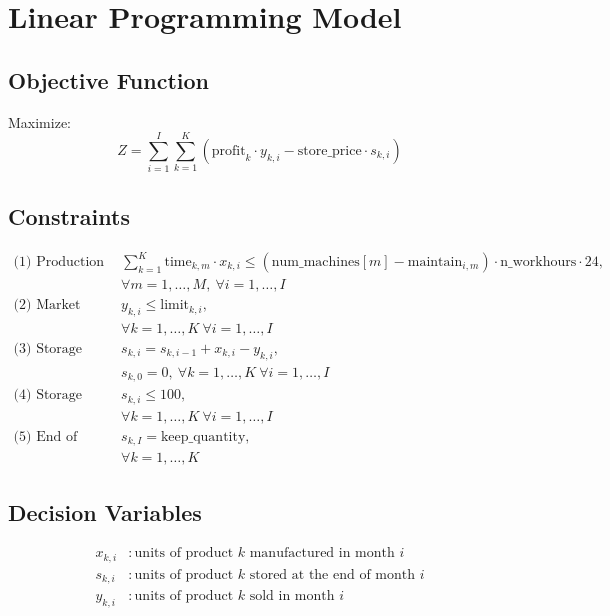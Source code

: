 \documentclass{article}
\begin{document}
\section*{Linear Programming Model}

\subsection*{Objective Function}

Maximize:
\[
Z = \sum_{i=1}^{I} \sum_{k=1}^{K} (\text{profit}_k \cdot y_{k,i} - \text{store\_price} \cdot s_{k,i})
\]

\subsection*{Constraints}

\begin{align*}
\text{(1) Production Time Constraints:} \quad & \sum_{k=1}^{K} \text{time}_{k,m} \cdot x_{k,i} \leq (\text{num\_machines}[m] - \text{maintain}_{i,m}) \cdot \text{n\_workhours} \cdot 24, \\
& \forall m = 1, \ldots, M, \ \forall i = 1, \ldots, I \\
\text{(2) Market Limitations:} \quad & y_{k,i} \leq \text{limit}_{k,i}, \\
& \forall k = 1, \ldots, K \ \forall i = 1, \ldots, I \\
\text{(3) Storage Balance:} \quad & s_{k,i} = s_{k,i-1} + x_{k,i} - y_{k,i}, \\
& s_{k,0} = 0, \ \forall k = 1, \ldots, K \ \forall i = 1, \ldots, I \\
\text{(4) Storage Capacity:} \quad & s_{k,i} \leq 100, \\
& \forall k = 1, \ldots, K \ \forall i = 1, \ldots, I \\
\text{(5) End of Planning Requirement:} \quad & s_{k,I} = \text{keep\_quantity}, \\
& \forall k = 1, \ldots, K
\end{align*}

\subsection*{Decision Variables}

\begin{align*}
x_{k,i} & : \text{units of product } k \text{ manufactured in month } i \\
s_{k,i} & : \text{units of product } k \text{ stored at the end of month } i \\
y_{k,i} & : \text{units of product } k \text{ sold in month } i
\end{align*}
\end{document}

